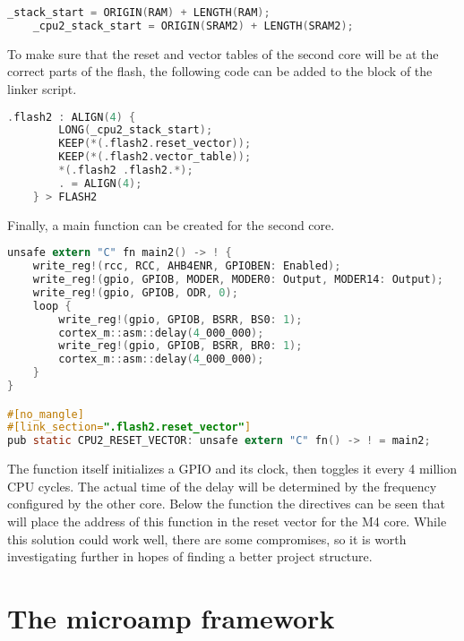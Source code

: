 \begin{lstlisting}[language=C,frame=single,float=!ht]
    _stack_start = ORIGIN(RAM) + LENGTH(RAM);
    _cpu2_stack_start = ORIGIN(SRAM2) + LENGTH(SRAM2);
\end{lstlisting}

To make sure that the reset and vector tables of the second core will be at the correct parts of the flash, the following code can be added to the  block of the linker script.

\begin{lstlisting}[language=C,frame=single,float=!ht]
    .flash2 : ALIGN(4) {
        LONG(_cpu2_stack_start);
        KEEP(*(.flash2.reset_vector));
        KEEP(*(.flash2.vector_table));
        *(.flash2 .flash2.*);
        . = ALIGN(4);
    } > FLASH2
\end{lstlisting}

Finally, a main function can be created for the second core.

\begin{lstlisting}[language=C,frame=single,float=!ht]
    unsafe extern "C" fn main2() -> ! {
    write_reg!(rcc, RCC, AHB4ENR, GPIOBEN: Enabled);
    write_reg!(gpio, GPIOB, MODER, MODER0: Output, MODER14: Output);
    write_reg!(gpio, GPIOB, ODR, 0);
    loop {
        write_reg!(gpio, GPIOB, BSRR, BS0: 1);
        cortex_m::asm::delay(4_000_000);
        write_reg!(gpio, GPIOB, BSRR, BR0: 1);
        cortex_m::asm::delay(4_000_000);
    }
}

#[no_mangle]
#[link_section=".flash2.reset_vector"]
pub static CPU2_RESET_VECTOR: unsafe extern "C" fn() -> ! = main2;
\end{lstlisting}

The function itself initializes a GPIO and its clock, then toggles it every 4 million CPU cycles. The actual time of the delay will be determined by the frequency configured by the other core. Below the function the directives can be seen that will place the address of this function in the reset vector for the M4 core. While this solution could work well, there are some compromises, so it is worth investigating further in hopes of finding a better project structure.

\section{The microamp framework}


